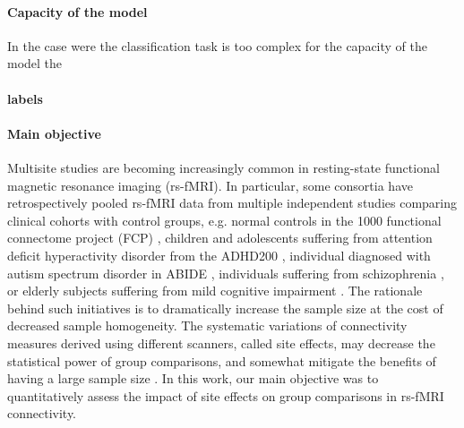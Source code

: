 \documentclass[authoryear]{elsarticle}
\begin{document}
\paragraph{Capacity of the model}
In the case were the classification task is too complex for the capacity of the model the 

\paragraph{labels}

\paragraph{Main objective}
Multisite studies are becoming increasingly common in resting-state functional
magnetic resonance imaging (rs-fMRI). In particular, some consortia have
retrospectively pooled rs-fMRI data from multiple independent studies comparing
clinical cohorts with control groups, e.g. normal controls in the 1000
functional connectome project (FCP) \citep{Biswal2010}, children and adolescents
suffering from attention deficit hyperactivity disorder from the ADHD200
\citep{ADHD200,Fair2012}, individual diagnosed with autism spectrum disorder in
ABIDE \citep{Nielsen2013}, individuals suffering from schizophrenia
\citep{Cheng2015}, or elderly subjects suffering from mild cognitive impairment
\citep{Tam2015}. The rationale behind such initiatives is to dramatically
increase the sample size at the cost of decreased sample homogeneity. The
systematic variations of connectivity measures derived using different scanners,
called site effects, may decrease the statistical power of group comparisons,
and somewhat mitigate the benefits of having a large sample size
\citep{Brown2011,Jovicich2016}. In this work, our main objective was to
quantitatively assess the impact of site effects on group comparisons in rs-fMRI
connectivity.
\end{document}
